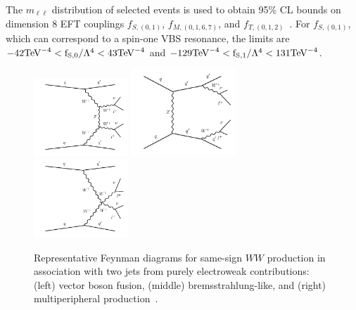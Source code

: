 The $m_{\ell\ell}$ distribution of selected events is used to obtain
95\% CL bounds on dimension 8 EFT couplings $f_{S,(0,1)}$,
$f_{M,(0,1,6,7)}$, and $f_{T,(0,1,2)}$~\cite{Eboli:2006wa}.  For
$f_{S,(0,1)}$, which can correspond to a spin-one VBS resonance, the
limits are $-42 \rm{TeV}^{-4} < f_{S,0}/\Lambda^4 < 43 \rm{TeV}^{-4}$
and $-129 \rm{TeV}^{-4} < f_{S,1}/\Lambda^4 < 131 \rm{TeV}^{-4}$.

\begin{figure}[htb] {
\centering
\includegraphics[width=0.315\textwidth]{figures/ss-exclboson-ww-diagram1.pdf}
\includegraphics[width=0.35\textwidth]{figures/ss-exclboson-ww-diagram2.pdf}
\includegraphics[width=0.315\textwidth]{figures/ss-exclboson-ww-diagram3.pdf}
\caption{
Representative Feynman diagrams for same-sign $WW$ production in association
with two jets from purely electroweak contributions:
(left) vector boson fusion,
(middle) bremsstrahlung-like,
and (right) multiperipheral production~\cite{Khachatryan:2014sta}.
\label{fig:ss-exclboson-ww-sigdiagram}}

}
\end{figure}


